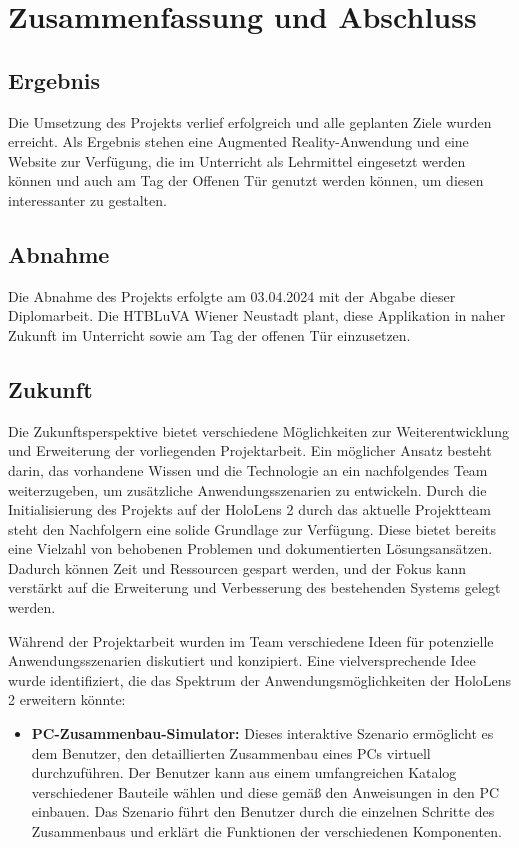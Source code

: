 \chapter{Zusammenfassung und Abschluss}

\section{Ergebnis}
Die Umsetzung des Projekts verlief erfolgreich und alle geplanten Ziele wurden erreicht. Als Ergebnis stehen eine
Augmented Reality-Anwendung und eine Website zur Verfügung, die im Unterricht als Lehrmittel eingesetzt werden können
und auch am Tag der Offenen Tür genutzt werden können, um diesen interessanter zu gestalten.

\section{Abnahme}
Die Abnahme des Projekts erfolgte am 03.04.2024 mit der Abgabe dieser Diplomarbeit. Die HTBLuVA Wiener Neustadt plant,
diese Applikation in naher Zukunft im Unterricht sowie am Tag der offenen Tür einzusetzen.

\section{Zukunft}
Die Zukunftsperspektive bietet verschiedene Möglichkeiten zur Weiterentwicklung und Erweiterung der vorliegenden
Projektarbeit. Ein möglicher Ansatz besteht darin, das vorhandene Wissen und die Technologie an ein nachfolgendes Team
weiterzugeben, um zusätzliche Anwendungsszenarien zu entwickeln. Durch die Initialisierung des Projekts auf der HoloLens
2 durch das aktuelle Projektteam steht den Nachfolgern eine solide Grundlage zur Verfügung. Diese bietet bereits eine
Vielzahl von behobenen Problemen und dokumentierten Lösungsansätzen. Dadurch können Zeit und Ressourcen gespart werden,
und der Fokus kann verstärkt auf die Erweiterung und Verbesserung des bestehenden Systems gelegt werden.

Während der Projektarbeit wurden im Team verschiedene Ideen für potenzielle Anwendungsszenarien diskutiert und konzipiert.
Eine vielversprechende Idee wurde identifiziert, die das Spektrum der Anwendungsmöglichkeiten der HoloLens 2 erweitern könnte:

\begin{itemize}
    \item \textbf{PC-Zusammenbau-Simulator:} Dieses interaktive Szenario ermöglicht es dem Benutzer, den detaillierten
    Zusammenbau eines PCs virtuell durchzuführen. Der Benutzer kann aus einem umfangreichen Katalog verschiedener Bauteile
    wählen und diese gemäß den Anweisungen in den PC einbauen. Das Szenario führt den Benutzer durch die einzelnen Schritte 
    des Zusammenbaus und erklärt die Funktionen der verschiedenen Komponenten.
\end{itemize}